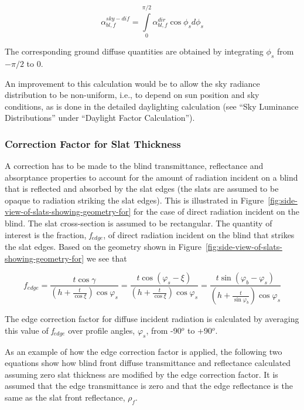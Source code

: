 \begin{equation}
\alpha_{bl,f}^{sky - dif} = \int\limits_0^{\pi /2} {\alpha_{bl,f}^{dir}\cos {\phi_s}d{\phi_s}}
\end{equation}

The corresponding ground diffuse quantities are obtained by integrating \({\phi_s}\) from \(- \pi /2\) to 0.

An improvement to this calculation would be to allow the sky radiance distribution to be non-uniform, i.e., to depend on sun position and sky conditions, as is done in the detailed daylighting calculation (see ``Sky Luminance Distributions'' under ``Daylight Factor Calculation'').

\subsubsection{Correction Factor for Slat Thickness}\label{correction-factor-for-slat-thickness}

A correction has to be made to the blind transmittance, reflectance and absorptance properties to account for the amount of radiation incident on a blind that is reflected and absorbed by the slat edges (the slats are assumed to be opaque to radiation striking the slat edges). This is illustrated in Figure~\ref{fig:side-view-of-slats-showing-geometry-for} for the case of direct radiation incident on the blind. The slat cross-section is assumed to be rectangular. The quantity of interest is the fraction, \emph{f\(_{edge}\)}, of direct radiation incident on the blind that strikes the slat edges. Based on the geometry shown in Figure~\ref{fig:side-view-of-slats-showing-geometry-for} we see that

\begin{equation}
{f_{edge}} = \frac{{t\cos \gamma }}{{\left( {h + \frac{t}{{\cos \xi }}} \right)\cos {\varphi_s}}} = \frac{{t\cos ({\varphi_s} - \xi )}}{{\left( {h + \frac{t}{{\cos \xi }}} \right)\cos {\varphi_s}}} = \frac{{t\sin ({\varphi_b} - {\varphi_s})}}{{\left( {h + \frac{t}{{\sin {\varphi_b}}}} \right)\cos {\varphi_s}}}
\end{equation}

The edge correction factor for diffuse incident radiation is calculated by averaging this value of \emph{f\(_{edge}\)} over profile angles, \(\varphi_s\), from -90\(^{o}\) to +90\(^{o}\).

As an example of how the edge correction factor is applied, the following two equations show how blind front diffuse transmittance and reflectance calculated assuming zero slat thickness are modified by the edge correction factor. It is assumed that the edge transmittance is zero and that the edge reflectance is the same as the slat front reflectance, \(\rho_f\).


